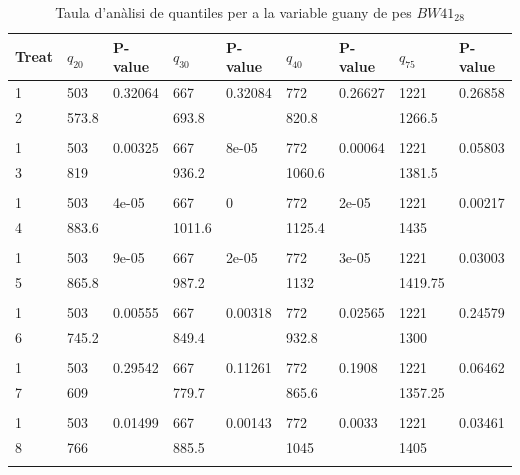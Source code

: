 \documentclass[11pt,a4paper]{article}\usepackage[]{graphicx}\usepackage[]{color}
\begin{document}
\begin{table}[ht]
\centering
\begingroup\fontsize{12pt}{12pt}\selectfont
\begin{tabular}{lllllllll}
  \toprule
{\textbf{Treat}} & {\textbf{$q_{20}$}} & {\textbf{P-value}} & {\textbf{$q_{30}$}} & {\textbf{P-value}} & {\textbf{$q_{40}$}} & {\textbf{P-value}} & {\textbf{$q_{75}$}} & {\textbf{P-value}} \\ 
  \midrule
1 & 503 & 0.32064 & 667 & 0.32084 & 772 & 0.26627 & 1221 & 0.26858 \\ 
  2 & 573.8 &  & 693.8 &  & 820.8 &  & 1266.5 &  \\ 
   &  &  &  &  &  &  &  &  \\ 
  1 & 503 & 0.00325 & 667 & 8e-05 & 772 & 0.00064 & 1221 & 0.05803 \\ 
  3 & 819 &  & 936.2 &  & 1060.6 &  & 1381.5 &  \\ 
   &  &  &  &  &  &  &  &  \\ 
  1 & 503 & 4e-05 & 667 & 0 & 772 & 2e-05 & 1221 & 0.00217 \\ 
  4 & 883.6 &  & 1011.6 &  & 1125.4 &  & 1435 &  \\ 
   &  &  &  &  &  &  &  &  \\ 
  1 & 503 & 9e-05 & 667 & 2e-05 & 772 & 3e-05 & 1221 & 0.03003 \\ 
  5 & 865.8 &  & 987.2 &  & 1132 &  & 1419.75 &  \\ 
   &  &  &  &  &  &  &  &  \\ 
  1 & 503 & 0.00555 & 667 & 0.00318 & 772 & 0.02565 & 1221 & 0.24579 \\ 
  6 & 745.2 &  & 849.4 &  & 932.8 &  & 1300 &  \\ 
   &  &  &  &  &  &  &  &  \\ 
  1 & 503 & 0.29542 & 667 & 0.11261 & 772 & 0.1908 & 1221 & 0.06462 \\ 
  7 & 609 &  & 779.7 &  & 865.6 &  & 1357.25 &  \\ 
   &  &  &  &  &  &  &  &  \\ 
  1 & 503 & 0.01499 & 667 & 0.00143 & 772 & 0.0033 & 1221 & 0.03461 \\ 
  8 & 766 &  & 885.5 &  & 1045 &  & 1405 &  \\ 
   &  &  &  &  &  &  &  &  \\ 
   \bottomrule
\end{tabular}
\endgroup
\caption{Taula d'anàlisi de quantiles per a la variable guany de pes $BW41_{28}$} 
\label{tab:tot}
\end{table}
\end{document}

